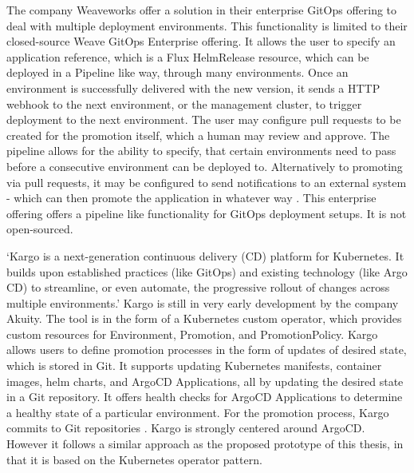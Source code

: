 
The company Weaveworks
offer a solution in their enterprise GitOps offering
to deal with multiple deployment environments.
This functionality is limited to their closed-source Weave GitOps Enterprise offering.
It allows the user to specify an application reference,
which is a Flux HelmRelease resource,
which can be deployed in a Pipeline like way,
through many environments.
Once an environment is successfully delivered with the new version,
it sends a HTTP webhook to the next environment, or the management cluster,
to trigger deployment to the next environment.
The user may configure pull requests to be created for the promotion itself,
which a human may review and approve.
The pipeline allows for the ability to specify, that certain environments need
to pass before a consecutive environment can be deployed to.
Alternatively to promoting via pull requests,
it may be configured to send notifications
to an external system -
which can then promote the application in whatever way
\autocite{weaveGitOpsPipelines}.
%
This enterprise offering offers a pipeline like functionality
for GitOps deployment setups. It is not open-sourced.


\enquote*{Kargo is a next-generation continuous delivery (CD) platform for Kubernetes. It builds upon established practices (like GitOps) and existing technology (like Argo CD) to streamline, or even automate, the progressive rollout of changes across multiple environments.}
\autocite{kargoAkuityWebsite}
Kargo is still in very early development by the company Akuity.
The tool is in the form of a Kubernetes custom operator, which provides custom resources
for Environment, Promotion, and PromotionPolicy.
Kargo allows users to define promotion processes in the form of updates of desired state,
which is stored in Git. It supports updating Kubernetes manifests, container images, helm charts,
and ArgoCD Applications, all by updating the desired state in a Git repository.
It offers health checks for ArgoCD Applications to determine a healthy state of a particular environment.
For the promotion process, Kargo commits to Git repositories
\autocite{kargoAkuityWebsite}.
Kargo is strongly centered around ArgoCD. However
it follows a similar approach as the proposed prototype of this thesis,
in that it is based on the Kubernetes operator pattern.

